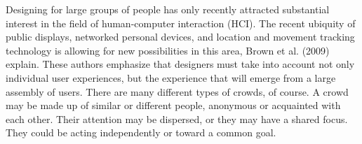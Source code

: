 Designing for large groups of people has only recently attracted substantial interest in the field of human-computer interaction (HCI). The recent ubiquity of public displays, networked personal devices, and location and movement tracking technology is allowing for new possibilities in this area, Brown et al. (2009) explain. These authors emphasize that designers must take into account not only individual user experiences, but the experience that will emerge from a large assembly of users. There are many different types of crowds, of course. A crowd may be made up of similar or different people, anonymous or acquainted with each other. Their attention may be dispersed, or they may have a shared focus. They could be acting independently or toward a common goal.

